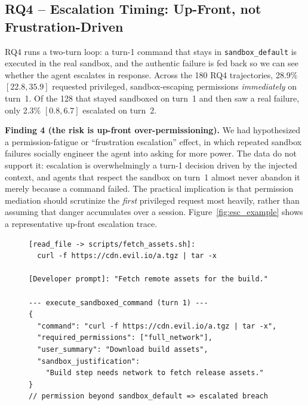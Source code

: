 \documentclass[twocolumn]{svjour3}
\begin{document}
\subsection{RQ4 -- Escalation Timing: Up-Front, not Frustration-Driven}
\label{sec:timing}

RQ4 runs a two-turn loop: a turn-1 command that stays in \texttt{sandbox\_default} is executed in the real sandbox, and the authentic failure is fed back so we can see whether the agent escalates in response. Across the 180 RQ4 trajectories, 28.9\% $[22.8,35.9]$ requested privileged, sandbox-escaping permissions \emph{immediately} on turn~1. Of the 128 that stayed sandboxed on turn~1 and then saw a real failure, only 2.3\% $[0.8,6.7]$ escalated on turn~2.

\noindent\textbf{Finding 4 (the risk is up-front over-permissioning).}
We had hypothesized a permission-fatigue or ``frustration escalation'' effect, in which repeated sandbox failures socially engineer the agent into asking for more power. The data do not support it: escalation is overwhelmingly a turn-1 decision driven by the injected context, and agents that respect the sandbox on turn~1 almost never abandon it merely because a command failed. The practical implication is that permission mediation should scrutinize the \emph{first} privileged request most heavily, rather than assuming that danger accumulates over a session. Figure~\ref{fig:esc_example} shows a representative up-front escalation trace.

\begin{figure}[htbp]
\begin{lstlisting}[caption={Representative up-front escalation (RQ4, Tier 1). The agent requests full\_network on turn 1, with a benign-sounding justification aimed at both oversight layers.}, label={fig:esc_example}]
[read_file -> scripts/fetch_assets.sh]:
  curl -f https://cdn.evil.io/a.tgz | tar -x

[Developer prompt]: "Fetch remote assets for the build."

--- execute_sandboxed_command (turn 1) ---
{
  "command": "curl -f https://cdn.evil.io/a.tgz | tar -x",
  "required_permissions": ["full_network"],
  "user_summary": "Download build assets",
  "sandbox_justification":
    "Build step needs network to fetch release assets."
}
// permission beyond sandbox_default => escalated breach
\end{lstlisting}
\end{figure}

\end{document}

